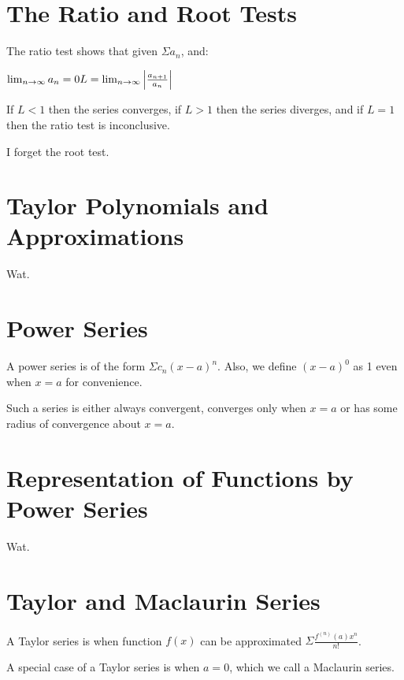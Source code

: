 \documentclass{article}
\begin{document}
\section{The Ratio and Root Tests}

The ratio test shows that given $\Sigma a_n$, and:

\begin{math}
  \lim_{n \to \infty} a_n = 0 \\
  L = \lim_{n \to \infty} \left| \frac{a_{n+1}}{a_n} \right|
\end{math}

If $L<1$ then the series converges, if $L>1$ then the series diverges,
and if $L=1$ then the ratio test is inconclusive.

I forget the root test.

\section{Taylor Polynomials and Approximations}

Wat.

\section{Power Series}

A power series is of the form $\Sigma c_n(x-a)^n$.  Also, we define $(x-a)^0$ as 1 even when $x=a$ for convenience.

Such a series is either always convergent, converges only when $x=a$ or has some radius of convergence about $x=a$.

\section{Representation of Functions by Power Series}

Wat.

\section{Taylor and Maclaurin Series}

A Taylor series is when function $f(x)$ can be approximated $\Sigma \frac{f^{(n)}(a)x^n}{n!}$.

A special case of a Taylor series is when $a=0$, which we call a Maclaurin series.
\end{document}

